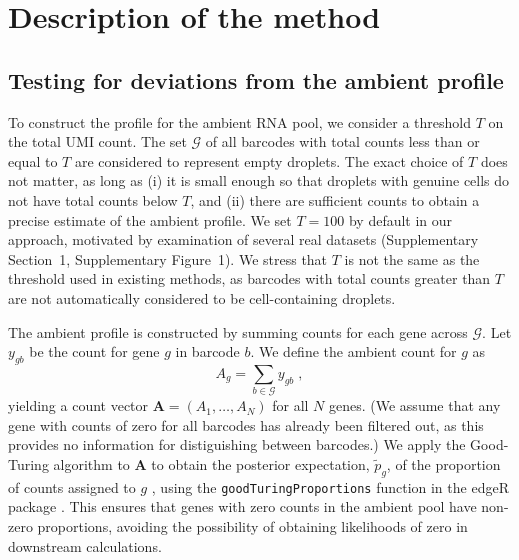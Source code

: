\documentclass[10pt,letterpaper]{article}
\newcommand{\code}[1]{\texttt{#1}}
\newcommand{\suppfignegative}{1}
\newcommand{\suppsecthreshold}{1}
\begin{document}
\section*{Description of the method}

\subsection*{Testing for deviations from the ambient profile}
To construct the profile for the ambient RNA pool, we consider a threshold $T$ on the total UMI count.
The set $\mathcal{G}$ of all barcodes with total counts less than or equal to $T$ are considered to represent empty droplets.
The exact choice of $T$ does not matter, as long as (i) it is small enough so that droplets with genuine cells do not have total counts below $T$,
and (ii) there are sufficient counts to obtain a precise estimate of the ambient profile.
We set $T=100$ by default in our approach, motivated by examination of several real datasets (Supplementary Section~\suppsecthreshold{}, Supplementary Figure~\suppfignegative{}).
We stress that $T$ is not the same as the threshold used in existing methods, as barcodes with total counts greater than $T$ are not automatically considered to be cell-containing droplets.

The ambient profile is constructed by summing counts for each gene across $\mathcal{G}$.
Let $y_{gb}$ be the count for gene $g$ in barcode $b$.
We define the ambient count for $g$ as 
\[
    A_{g} = \sum_{b \in \mathcal{G}} y_{gb} \;,
\]
yielding a count vector $\mathbf{A} = (A_1, \dots, A_N)$ for all $N$ genes.
(We assume that any gene with counts of zero for all barcodes has already been filtered out, as this provides no information for distiguishing between barcodes.)
We apply the Good-Turing algorithm to $\mathbf{A}$ to obtain the posterior expectation, $\tilde{p}_g$, of the proportion of counts assigned to $g$ \cite{gale1995good}, using the \code{goodTuringProportions} function in the \textsf{edgeR} package \cite{robinson2010edgeR}.
This ensures that genes with zero counts in the ambient pool have non-zero proportions, avoiding the possibility of obtaining likelihoods of zero in downstream calculations.
\end{document}
